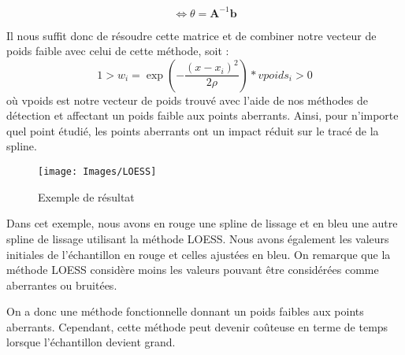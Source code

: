 \documentclass[a4paper,12pt]{article} %
\begin{document}
                        \[\iff \theta = \mathbf{A}^{-1} \mathbf{b}\]
                    
                    Il nous suffit donc de résoudre cette matrice et de combiner notre vecteur de poids faible avec celui de cette méthode, soit :
                    \[1 > w_i = \exp \left( - \frac{(x -x_i)^2}{2 \rho} \right)*vpoids_i > 0\] 
                    où vpoids est notre vecteur de poids trouvé avec l'aide de nos méthodes de détection et affectant un poids faible aux points aberrants.
                    Ainsi, pour n'importe quel point étudié, les points aberrants ont un impact réduit sur le tracé de la spline.
                    
                    \begin{figure}[H]
                        \centering
                        \texttt{[image: Images/LOESS]}
                        \caption{Exemple de résultat }
                        \label{fig:exemple}
                    \end{figure}
                    
                    Dans cet exemple, nous avons en rouge une spline de lissage et en bleu une autre spline de lissage utilisant la méthode LOESS.  Nous avons également les valeurs initiales de l'échantillon en rouge et celles ajustées en bleu. On remarque que la méthode LOESS considère moins les valeurs pouvant être considérées comme aberrantes ou bruitées.
                    
                    
                    On a donc une méthode fonctionnelle donnant un poids faibles aux points aberrants. Cependant, cette méthode peut devenir coûteuse en terme de temps lorsque l'échantillon devient grand.
\end{document}
